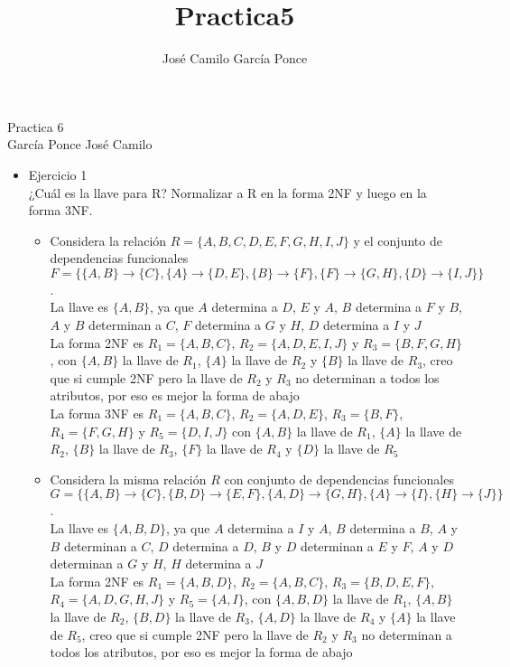 \documentclass{article}
\title{Practica5}
\author{José Camilo García Ponce}
\begin{document}
Practica 6 \\
García Ponce José Camilo \\

\begin{itemize}
    \item Ejercicio 1 \\
    ¿Cuál es la llave para R? Normalizar a R en la forma 2NF y luego en la forma 3NF. \\
    \begin{itemize}
        \item Considera la relación $R = \{A, B, C, D, E, F, G, H, I, J\}$ y el conjunto de dependencias funcionales $F = \{ \{A, B\} \rightarrow \{C\}, \{A\} \rightarrow \{D, E\}, \{B\} \rightarrow \{F\}, \{F\} \rightarrow \{G,H\}, \{D\} \rightarrow \{I, J\} \}$. \\

        La llave es $\{A,B\}$, ya que $A$ determina a $D$, $E$ y $A$, $B$ determina a $F$ y $B$, $A$ y $B$ determinan a $C$, $F$ determina a $G$ y $H$, $D$ determina a $I$ y $J$ \\

        La forma 2NF es $R_1 = \{A,B,C\}$, $R_2 = \{A,D,E,I,J\}$ y $R_3 = \{B,F,G,H\}$, con $\{A,B\}$ la llave de $R_1$, $\{A\}$ la llave de $R_2$ y $\{B\}$ la llave de $R_3$, creo que si cumple 2NF pero la llave de $R_2$ y $R_3$ no determinan a todos los atributos, por eso es mejor la forma de abajo \\

        La forma 3NF es $R_1 = \{A,B,C\}$, $R_2 = \{A,D,E\}$, $R_3 = \{B,F\}$, $R_4 = \{F,G,H\}$ y $R_5 = \{D,I,J\}$ con $\{A,B\}$ la llave de $R_1$, $\{A\}$ la llave de $R_2$, $\{B\}$ la llave de $R_3$, $\{F\}$ la llave de $R_4$ y $\{D\}$ la llave de $R_5$ \\

        \item Considera la misma relación $R$ con conjunto de dependencias funcionales $G = \{\{A, B\} \rightarrow \{C\}, \{B, D\} \rightarrow \{E, F\}, \{A, D\} \rightarrow \{G, H\}, \{A\} \rightarrow \{I\}, \{H\} \rightarrow \{J\} \}$. \\

        La llave es $\{A,B,D\}$, ya que $A$ determina a $I$ y $A$, $B$ determina a $B$, $A$ y $B$ determinan a $C$, $D$ determina a $D$, $B$ y $D$ determinan a $E$ y $F$, $A$ y $D$ determinan a $G$ y $H$, $H$ determina a $J$ \\

        La forma 2NF es $R_1 = \{A,B,D\}$, $R_2 = \{A,B,C\}$, $R_3 = \{B,D,E,F\}$, $R_4 = \{A,D,G,H,J\}$ y $R_5 = \{A,I\}$, con $\{A,B,D\}$ la llave de $R_1$, $\{A,B\}$ la llave de $R_2$, $\{B,D\}$ la llave de $R_3$, $\{A,D\}$ la llave de $R_4$ y $\{A\}$ la llave de $R_5$, creo que si cumple 2NF pero la llave de $R_2$ y $R_3$ no determinan a todos los atributos, por eso es mejor la forma de abajo \\


\end{itemize}
\end{itemize}
\end{document}
